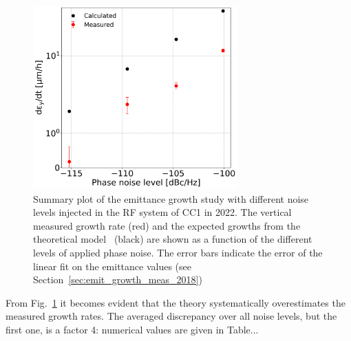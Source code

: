 \begin{figure}[!h]
   \centering         
   \includegraphics[width=0.7\textwidth]{images/Ch8/emit_V_background_subtracted_noise_scan.png}
       \caption{Summary plot of the emittance growth study with different noise levels injected in the RF system of CC1 in 2022. The vertical measured growth rate (red) and the expected growths from the theoretical model~\cite{PhysRevSTAB.18.101001} (black) are shown as a function of the different levels of applied phase noise. The error bars indicate the error of the linear fit on the emittance values (see Section~\ref{sec:emit_growth_meas_2018})}
       \label{fig:V_emit_growth_background_subtracted_noise_scan}
\end{figure}

From Fig.~\ref{fig:V_emit_growth_background_subtracted_noise_scan} it becomes evident that the theory systematically overestimates the measured growth rates. The averaged discrepancy over all noise levels, but the first one, is a factor 4: numerical values are given in Table...



